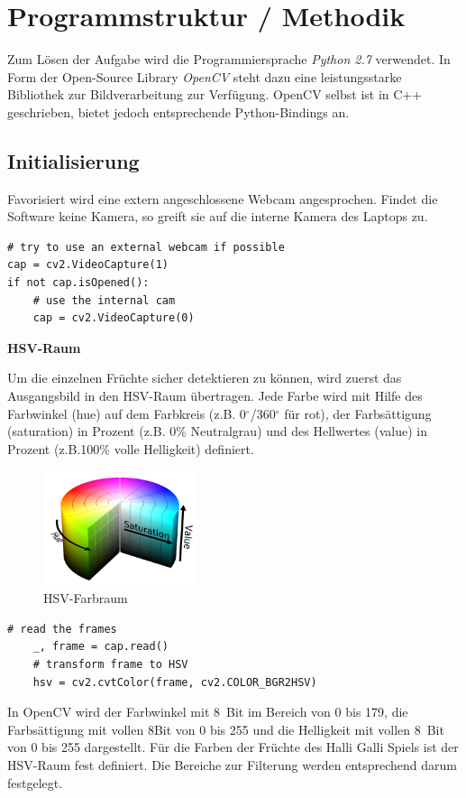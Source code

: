 
\section{Programmstruktur / Methodik}
\label{sec:Programmstruktur}

Zum Lösen der Aufgabe wird die Programmiersprache \emph{Python 2.7} verwendet. In Form der Open-Source Library \emph{OpenCV} steht dazu eine leistungsstarke Bibliothek zur Bildverarbeitung zur Verfügung.
OpenCV selbst ist in C++ geschrieben, bietet jedoch entsprechende Python-Bindings an.


\subsection{Initialisierung}

Favorisiert wird eine extern angeschlossene Webcam angesprochen. Findet die Software keine Kamera, so greift sie auf die interne Kamera des Laptops zu. 

\lstset{language=Python}
\begin{lstlisting}[]
# try to use an external webcam if possible
cap = cv2.VideoCapture(1)
if not cap.isOpened():
    # use the internal cam
    cap = cv2.VideoCapture(0)
\end{lstlisting}

\textbf{HSV-Raum}

Um die einzelnen Früchte sicher detektieren zu können, wird zuerst das Ausgangsbild in den HSV-Raum übertragen. Jede Farbe wird mit Hilfe des Farbwinkel (hue) auf dem Farbkreis (z.B. 0$^\circ$/360$^\circ$  für rot), der Farbsättigung (saturation) in Prozent (z.B. 0\% Neutralgrau) und des Hellwertes (value) in Prozent (z.B.100\% volle Helligkeit) definiert.
\begin{figure}[H]
    \centering
    \includegraphics[width=0.4\textwidth]{Abbildungen/HSV_color}
    \caption[HSV]{HSV-Farbraum}
    \label{fig:HSV-Farbraum}
\end{figure}
\lstset{language=Python}
\begin{lstlisting}[]
    # read the frames
    _, frame = cap.read()
    # transform frame to HSV
    hsv = cv2.cvtColor(frame, cv2.COLOR_BGR2HSV)
\end{lstlisting}
In OpenCV wird der Farbwinkel mit 8~Bit im Bereich von 0 bis 179, die Farbsättigung mit vollen 8Bit von 0 bis 255 und die Helligkeit mit vollen 8~Bit von 0 bis 255 dargestellt.
Für die Farben der Früchte des Halli Galli Spiels ist der HSV-Raum fest definiert. Die Bereiche zur Filterung werden entsprechend darum festgelegt. 

